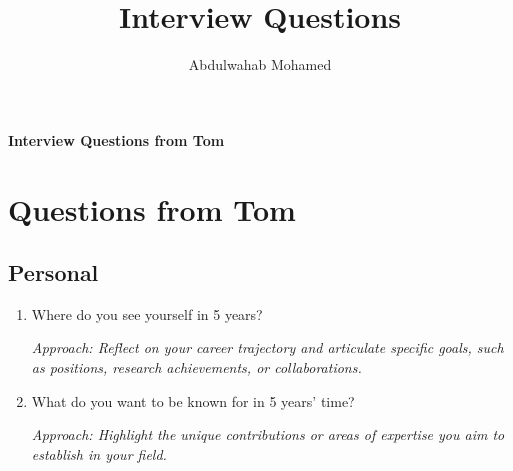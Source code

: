 \documentclass[12pt]{article}
\title{Interview Questions}
\author{Abdulwahab Mohamed}
\numberwithin{equation}{section}
\begin{document}
\begin{center}
    {\Large \textbf{Interview Questions from Tom}} \\ \vspace{1pt}
\end{center}


\section{Questions from Tom}

\subsection{Personal}
\begin{enumerate}
    \item Where do you see yourself in 5 years?
    
    \textit{Approach: Reflect on your career trajectory and articulate specific goals, such as positions, research achievements, or collaborations.}

    \item What do you want to be known for in 5 years' time?
    
    \textit{Approach: Highlight the unique contributions or areas of expertise you aim to establish in your field.}
\end{enumerate}
\end{document}

